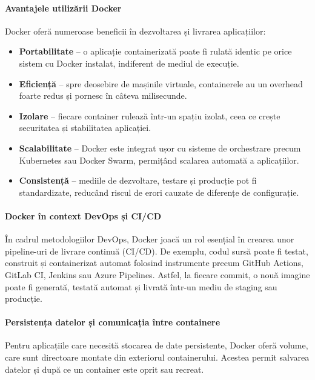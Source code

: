 \documentclass[titlepage,12pt]{article}
\begin{document}
\paragraph{Avantajele utilizării Docker}

Docker oferă numeroase beneficii în dezvoltarea și livrarea aplicațiilor:

\begin{itemize}
\item \textbf{Portabilitate} – o aplicație containerizată poate fi rulată identic pe orice sistem cu Docker instalat, indiferent de mediul de execuție.
\item \textbf{Eficiență} – spre deosebire de mașinile virtuale, containerele au un overhead foarte redus și pornesc în câteva milisecunde.
\item \textbf{Izolare} – fiecare container rulează într-un spațiu izolat, ceea ce crește securitatea și stabilitatea aplicației.
\item \textbf{Scalabilitate} – Docker este integrat ușor cu sisteme de orchestrare precum Kubernetes sau Docker Swarm, permițând scalarea automată a aplicațiilor.
\item \textbf{Consistență} – mediile de dezvoltare, testare și producție pot fi standardizate, reducând riscul de erori cauzate de diferențe de configurație.
\end{itemize}

\paragraph{Docker în context DevOps și CI/CD}

În cadrul metodologiilor DevOps, Docker joacă un rol esențial în crearea unor pipeline-uri de livrare continuă (CI/CD).
De exemplu, codul sursă poate fi testat, construit și containerizat automat folosind instrumente precum GitHub Actions, GitLab CI, Jenkins sau Azure Pipelines.
Astfel, la fiecare commit, o nouă imagine poate fi generată, testată automat și livrată într-un mediu de staging sau producție.

\paragraph{Persistența datelor și comunicația între containere}

Pentru aplicațiile care necesită stocarea de date persistente, Docker oferă volume, care sunt directoare montate din exteriorul containerului.
Acestea permit salvarea datelor și după ce un container este oprit sau recreat.
\end{document}
